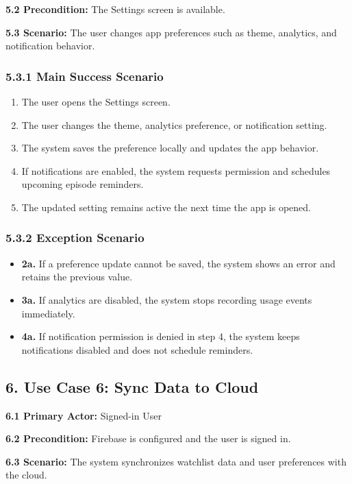 \noindent\textbf{5.2 Precondition:} The Settings screen is available.

\noindent\textbf{5.3 Scenario:} The user changes app preferences such as theme, analytics, and notification behavior.

\subsubsection*{5.3.1 Main Success Scenario}
\begin{enumerate}[label=\arabic*.]
	\item The user opens the Settings screen.
	\item The user changes the theme, analytics preference, or notification setting.
	\item The system saves the preference locally and updates the app behavior.
	\item If notifications are enabled, the system requests permission and schedules upcoming episode reminders.
	\item The updated setting remains active the next time the app is opened.
\end{enumerate}

\subsubsection*{5.3.2 Exception Scenario}
\begin{itemize}
	\item \textbf{2a.} If a preference update cannot be saved, the system shows an error and retains the previous value.
	\item \textbf{3a.} If analytics are disabled, the system stops recording usage events immediately.
	\item \textbf{4a.} If notification permission is denied in step 4, the system keeps notifications disabled and does not schedule reminders.
\end{itemize}

\subsection*{6. Use Case 6: Sync Data to Cloud}
\noindent\textbf{6.1 Primary Actor:} Signed-in User

\noindent\textbf{6.2 Precondition:} Firebase is configured and the user is signed in.

\noindent\textbf{6.3 Scenario:} The system synchronizes watchlist data and user preferences with the cloud.

